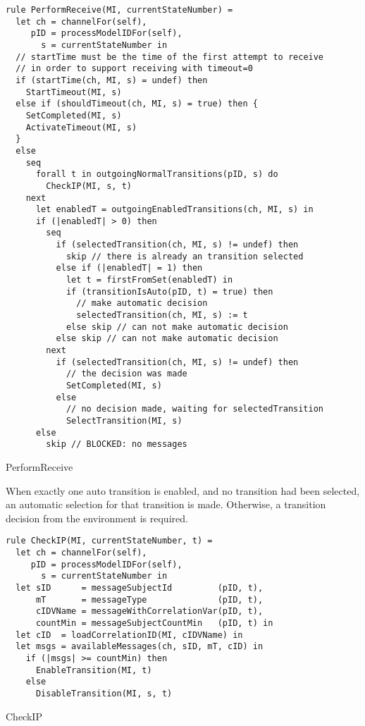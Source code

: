 \begin{listing}[htbp]
\begin{verbatim}
rule PerformReceive(MI, currentStateNumber) =
  let ch = channelFor(self),
     pID = processModelIDFor(self),
       s = currentStateNumber in
  // startTime must be the time of the first attempt to receive
  // in order to support receiving with timeout=0
  if (startTime(ch, MI, s) = undef) then
    StartTimeout(MI, s)
  else if (shouldTimeout(ch, MI, s) = true) then {
    SetCompleted(MI, s)
    ActivateTimeout(MI, s)
  }
  else
    seq
      forall t in outgoingNormalTransitions(pID, s) do
        CheckIP(MI, s, t)
    next
      let enabledT = outgoingEnabledTransitions(ch, MI, s) in
      if (|enabledT| > 0) then
        seq
          if (selectedTransition(ch, MI, s) != undef) then
            skip // there is already an transition selected
          else if (|enabledT| = 1) then
            let t = firstFromSet(enabledT) in
            if (transitionIsAuto(pID, t) = true) then
              // make automatic decision
              selectedTransition(ch, MI, s) := t
            else skip // can not make automatic decision
          else skip // can not make automatic decision
        next
          if (selectedTransition(ch, MI, s) != undef) then
            // the decision was made
            SetCompleted(MI, s)
          else
            // no decision made, waiting for selectedTransition
            SelectTransition(MI, s)
      else
        skip // BLOCKED: no messages
\end{verbatim}
\caption{PerformReceive}
\label{lst:shortasm:PerformReceive}
\end{listing}




When exactly one auto transition is enabled, and no transition had been selected, an automatic selection for that transition is made. Otherwise, a transition decision from the environment is required.


\begin{listing}[htbp]
\begin{verbatim}
rule CheckIP(MI, currentStateNumber, t) =
  let ch = channelFor(self),
     pID = processModelIDFor(self),
       s = currentStateNumber in
  let sID      = messageSubjectId         (pID, t),
      mT       = messageType              (pID, t),
      cIDVName = messageWithCorrelationVar(pID, t),
      countMin = messageSubjectCountMin   (pID, t) in
  let cID  = loadCorrelationID(MI, cIDVName) in
  let msgs = availableMessages(ch, sID, mT, cID) in
    if (|msgs| >= countMin) then
      EnableTransition(MI, t)
    else
      DisableTransition(MI, s, t)
\end{verbatim}
\caption{CheckIP}
\label{lst:shortasm:CheckIP}
\end{listing}


